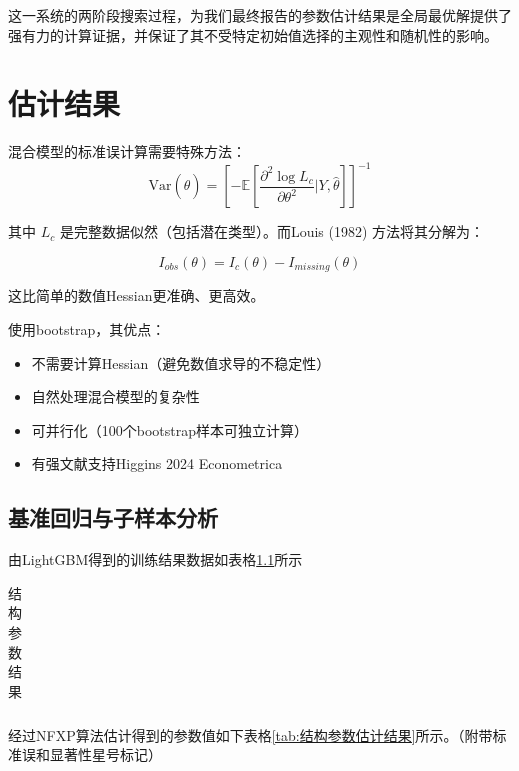 \documentclass[
  a4paper,
  zihao=-4,
  fontset=mac,
  AutoFakeBold,
  AutoFakeSlant,
  oneside]{ctexbook}
\begin{document}
这一系统的两阶段搜索过程，为我们最终报告的参数估计结果是全局最优解提供了强有力的计算证据，并保证了其不受特定初始值选择的主观性和随机性的影响。



\chapter{估计结果}



混合模型的标准误计算需要特殊方法：
$$\text{Var}(\hat{\theta}) = \left[ -\mathbb{E}\left[\frac{\partial^2 \log L_c}{\partial\theta^2}\bigg|Y,\hat{\theta}\right] \right]^{-1}$$

其中 $L_c$ 是完整数据似然（包括潜在类型）。而Louis (1982) 方法将其分解为：

$$I_{obs}(\theta) = I_{c}(\theta) - I_{missing}(\theta)$$

这比简单的数值Hessian更准确、更高效。


使用bootstrap，其优点：
\begin{itemize}
  \item 不需要计算Hessian（避免数值求导的不稳定性）
  \item 自然处理混合模型的复杂性
  \item 可并行化（100个bootstrap样本可独立计算）
  \item 有强文献支持Higgins 2024 Econometrica
\end{itemize}


\section{基准回归与子样本分析} %


由LightGBM得到的训练结果数据如表格\ref{tab:机器学习插件训练结果}所示
\begin{table}[!ht]
\centering
\caption{结构参数结果}
\begin{tabularx}{\textwidth}{@{}cXXX@{}}
\toprule
\midrule
\bottomrule
\end{tabularx}
\label{tab:机器学习插件训练结果}
\end{table}




经过NFXP算法估计得到的参数值如下表格\ref{tab:结构参数估计结果}所示。（附带标准误和显著性星号标记）
\end{document}
